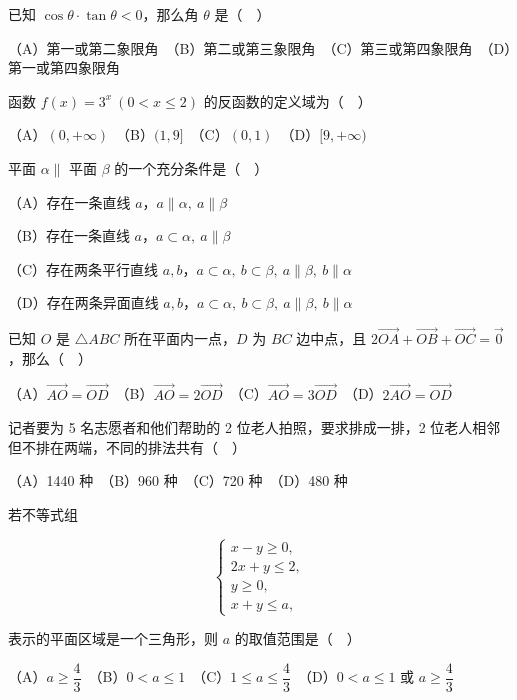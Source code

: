


\begin{question}
已知 $\cos\theta\cdot\tan\theta<0$，那么角 $\theta$ 是（　）

（A）第一或第二象限角　（B）第二或第三象限角　（C）第三或第四象限角　（D）第一或第四象限角

\end{question}
\begin{question}
函数 $f(x)=3^x\ (0<x\leq 2)$ 的反函数的定义域为（　）

（A）$(0,+\infty)$　（B）$(1,9]$　（C）$(0,1)$　（D）$[9,+\infty)$

\end{question}
\begin{question}
平面 $\alpha\parallel$ 平面 $\beta$ 的一个充分条件是（　）

（A）存在一条直线 $a$，$a\parallel\alpha,\ a\parallel\beta$

（B）存在一条直线 $a$，$a\subset\alpha,\ a\parallel\beta$

（C）存在两条平行直线 $a,b$，$a\subset\alpha,\ b\subset\beta,\ a\parallel\beta,\ b\parallel\alpha$

（D）存在两条异面直线 $a,b$，$a\subset\alpha,\ b\subset\beta,\ a\parallel\beta,\ b\parallel\alpha$

\end{question}
\begin{question}
已知 $O$ 是 $\triangle ABC$ 所在平面内一点，$D$ 为 $BC$ 边中点，且
$2\overrightarrow{OA}+\overrightarrow{OB}+\overrightarrow{OC}=\vec{0}$，那么（　）

（A）$\overrightarrow{AO}=\overrightarrow{OD}$　（B）$\overrightarrow{AO}=2\overrightarrow{OD}$　（C）$\overrightarrow{AO}=3\overrightarrow{OD}$　（D）$2\overrightarrow{AO}=\overrightarrow{OD}$

\end{question}
\begin{question}
记者要为 5 名志愿者和他们帮助的 2 位老人拍照，要求排成一排，2 位老人相邻但不排在两端，不同的排法共有（　）

（A）1440 种　（B）960 种　（C）720 种　（D）480 种

\end{question}
\begin{question}
若不等式组

\nopagebreak[4]
\[
\begin{cases}
x-y\geq 0,\\
2x+y\leq 2,\\
y\geq 0,\\
x+y\leq a,
\end{cases}
\]

表示的平面区域是一个三角形，则 $a$ 的取值范围是（　）

（A）$a\geq\dfrac43$　（B）$0<a\leq 1$　（C）$1\leq a\leq\dfrac43$　（D）$0<a\leq 1$ 或 $a\geq\dfrac43$

\end{question}
